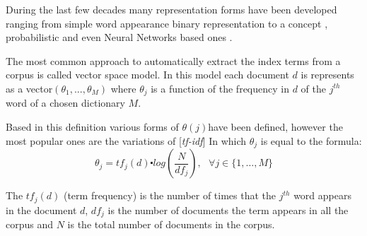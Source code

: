  During the last few decades many representation forms have been developed
 ranging from simple word appearance binary representation to a concept
 \cite{deerwester90indexing}, probabilistic and
 even Neural Networks  based ones \cite{keller-theme} \cite{361220}.

The most common approach to automatically extract the index terms
from a corpus is called vector space model. In this
model each document $d$ is represents as a vector$(\theta_{1},...,\theta_{M})$
where $\theta_{j}$ is a function of the frequency in $d$ of the
$j^{th}$ word of a chosen dictionary $M$. 

Based in this definition various forms of $\theta(j)$have been defined,
however the most popular ones are the variations of [{\emph{tf-idf}}]  In
which $\theta_{j}$ is equal to the formula:
\begin{equation}
  \theta_{j}=tf_{j}(d)\centerdot log(\frac{N}{df_{j}}),\,\,\,\,\forall
  j\in\{1,\ldots,M\}\label{eq:tf-idf}
\end{equation}


 The $tf_{j}(d)$ (term frequency) is the number of times that the $j^{th}$ word appears
 in the document $d$, $df_{j}$ is the number of documents the term
 appears in all the corpus and $N$ is the total number of documents
 in the corpus. 


